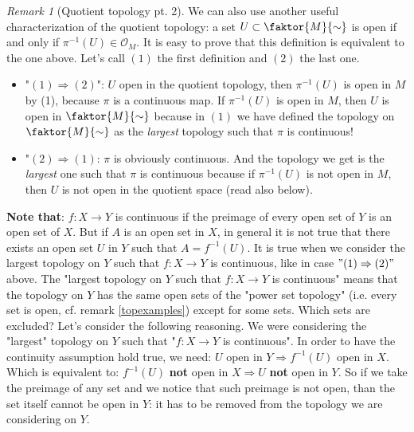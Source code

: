 \documentclass[a4paper,11pt,titlepage, article, oneside]{memoir}
\numberwithin{equation}{section}
\theoremstyle{definition}
\theoremstyle{remark}
\newtheorem{remark}[theorem]{Remark}
\begin{document}
\begin{remarkbox}\begin{remark}[Quotient topology pt. 2]
We can also use another useful characterization of the quotient topology: a set $U \subset \faktor{M}{\sim}$ is open if and only if $\pi^{-1}(U) \in \mathcal{O}_M$. It is easy to prove that this definition is equivalent to the one above. Let's call $(1)$ the first definition and $(2)$ the last one.
\begin{itemize}
\item "$(1) \Rightarrow (2)$": $U$ open in the quotient topology, then $\pi^{-1}(U)$ is open in $M$ by (1), because $\pi$ is a continuous map. If $\pi^{-1}(U)$ is open in $M$, then $U$ is open in $\faktor{M}{\sim}$ because in $(1)$ we have defined the topology on $\faktor{M}{\sim}$ as the \textit{largest} topology such that $\pi$ is continuous!
\item "$(2) \Rightarrow (1)$: $\pi$ is obviously continuous. And the topology we get is the \textit{largest} one such that $\pi$ is continuous because if $\pi^{-1}(U)$ is not open in $M$, then $U$ is not open in the quotient space (read also below).
\end{itemize}
\textbf{Note that}: $f\colon X \rightarrow Y$ is continuous if the preimage of every open set of $Y$ is an open set of $X$. But if $A$ is an open set in $X$, in general it is not true that there exists an open set $U$ in $Y$ such that $A = f^{-1}(U)$. It is true when we consider the largest topology on $Y$ such that $f\colon X \rightarrow Y$ is continuous, like in case $"(1) \Rightarrow (2)"$ above. The "largest topology on $Y$ such that $f\colon X \rightarrow Y$ is continuous" means that the topology on $Y$ has the same open sets of the "power set topology" (i.e. every set is open, cf. remark \ref{topexamples}) except for some sets. Which sets are excluded? Let's consider the following reasoning. We were considering the "largest" topology on $Y$ such that "$f\colon X \rightarrow Y$ is continuous". In order to have the continuity assumption hold true, we need: $U$ open in $Y \Rightarrow f^{-1}(U)$ open in $X$. Which is equivalent to: $f^{-1}(U)$ \textbf{not} open in $X \Rightarrow U$ \textbf{not} open in $Y$. So if we take the preimage of any set and we notice that such preimage is not open, than the set itself cannot be open in $Y$: it has to be removed from the topology we are considering on $Y$.
\end{remark}\end{remarkbox}
\end{document}
